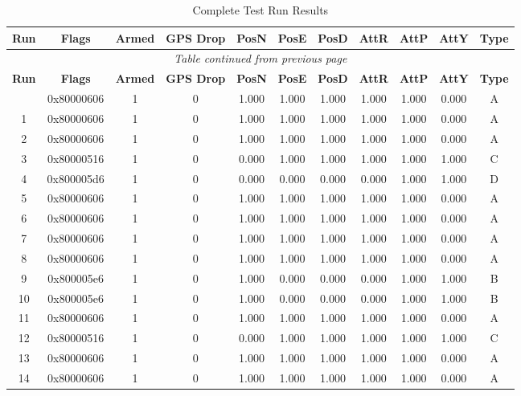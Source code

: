 \documentclass[11pt,a4paper]{article}
\begin{document}
\begin{longtable}{@{}ccccccccccc@{}}
\caption{Complete Test Run Results} \label{tab:raw_results} \\
\toprule
\textbf{Run} & \textbf{Flags} & \textbf{Armed} & \textbf{GPS Drop} & \textbf{PosN} & \textbf{PosE} & \textbf{PosD} & \textbf{AttR} & \textbf{AttP} & \textbf{AttY} & \textbf{Type} \\
\midrule
\endfirsthead
\multicolumn{11}{c}{\textit{Table continued from previous page}} \\
\toprule
\textbf{Run} & \textbf{Flags} & \textbf{Armed} & \textbf{GPS Drop} & \textbf{PosN} & \textbf{PosE} & \textbf{PosD} & \textbf{AttR} & \textbf{AttP} & \textbf{AttY} & \textbf{Type} \\
\midrule
\endhead
\midrule
\endfoot
\bottomrule
\endlastfoot
0 & 0x80000606 & 1 & 0 & 1.000 & 1.000 & 1.000 & 1.000 & 1.000 & 0.000 & A \\
1 & 0x80000606 & 1 & 0 & 1.000 & 1.000 & 1.000 & 1.000 & 1.000 & 0.000 & A \\
2 & 0x80000606 & 1 & 0 & 1.000 & 1.000 & 1.000 & 1.000 & 1.000 & 0.000 & A \\
3 & 0x80000516 & 1 & 0 & 0.000 & 1.000 & 1.000 & 1.000 & 1.000 & 1.000 & C \\
4 & 0x800005d6 & 1 & 0 & 0.000 & 0.000 & 0.000 & 0.000 & 1.000 & 1.000 & D \\
5 & 0x80000606 & 1 & 0 & 1.000 & 1.000 & 1.000 & 1.000 & 1.000 & 0.000 & A \\
6 & 0x80000606 & 1 & 0 & 1.000 & 1.000 & 1.000 & 1.000 & 1.000 & 0.000 & A \\
7 & 0x80000606 & 1 & 0 & 1.000 & 1.000 & 1.000 & 1.000 & 1.000 & 0.000 & A \\
8 & 0x80000606 & 1 & 0 & 1.000 & 1.000 & 1.000 & 1.000 & 1.000 & 0.000 & A \\
9 & 0x800005e6 & 1 & 0 & 1.000 & 0.000 & 0.000 & 0.000 & 1.000 & 1.000 & B \\
10 & 0x800005e6 & 1 & 0 & 1.000 & 0.000 & 0.000 & 0.000 & 1.000 & 1.000 & B \\
11 & 0x80000606 & 1 & 0 & 1.000 & 1.000 & 1.000 & 1.000 & 1.000 & 0.000 & A \\
12 & 0x80000516 & 1 & 0 & 0.000 & 1.000 & 1.000 & 1.000 & 1.000 & 1.000 & C \\
13 & 0x80000606 & 1 & 0 & 1.000 & 1.000 & 1.000 & 1.000 & 1.000 & 0.000 & A \\
14 & 0x80000606 & 1 & 0 & 1.000 & 1.000 & 1.000 & 1.000 & 1.000 & 0.000 & A \\

\end{longtable}
\end{document}
